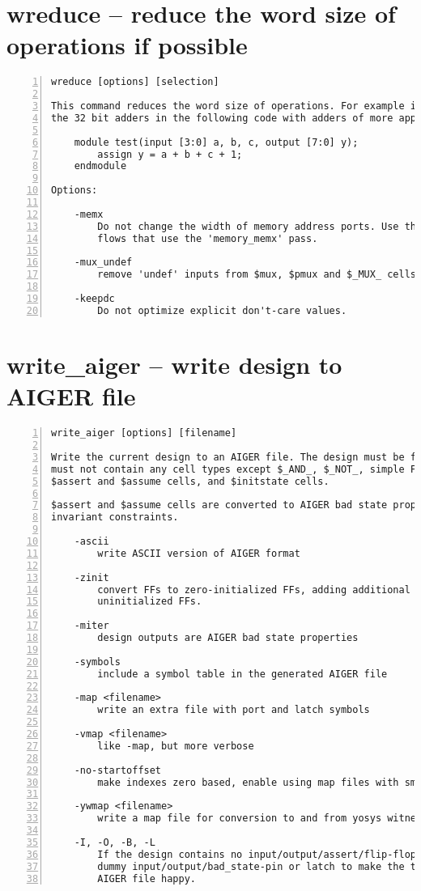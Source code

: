 \section{wreduce -- reduce the word size of operations if possible}
\label{cmd:wreduce}
\begin{lstlisting}[numbers=left,frame=single]
    wreduce [options] [selection]

This command reduces the word size of operations. For example it will replace
the 32 bit adders in the following code with adders of more appropriate widths:

    module test(input [3:0] a, b, c, output [7:0] y);
        assign y = a + b + c + 1;
    endmodule

Options:

    -memx
        Do not change the width of memory address ports. Use this options in
        flows that use the 'memory_memx' pass.

    -mux_undef
        remove 'undef' inputs from $mux, $pmux and $_MUX_ cells

    -keepdc
        Do not optimize explicit don't-care values.
\end{lstlisting}

\section{write\_aiger -- write design to AIGER file}
\label{cmd:write_aiger}
\begin{lstlisting}[numbers=left,frame=single]
    write_aiger [options] [filename]

Write the current design to an AIGER file. The design must be flattened and
must not contain any cell types except $_AND_, $_NOT_, simple FF types,
$assert and $assume cells, and $initstate cells.

$assert and $assume cells are converted to AIGER bad state properties and
invariant constraints.

    -ascii
        write ASCII version of AIGER format

    -zinit
        convert FFs to zero-initialized FFs, adding additional inputs for
        uninitialized FFs.

    -miter
        design outputs are AIGER bad state properties

    -symbols
        include a symbol table in the generated AIGER file

    -map <filename>
        write an extra file with port and latch symbols

    -vmap <filename>
        like -map, but more verbose

    -no-startoffset
        make indexes zero based, enable using map files with smt solvers.

    -ywmap <filename>
        write a map file for conversion to and from yosys witness traces.

    -I, -O, -B, -L
        If the design contains no input/output/assert/flip-flop then create one
        dummy input/output/bad_state-pin or latch to make the tools reading the
        AIGER file happy.
\end{lstlisting}

